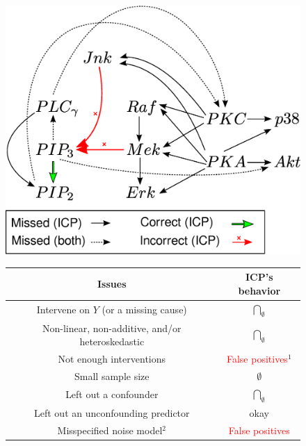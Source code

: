 \documentclass[12pt]{article}
\begin{document}
\maketitle

\newcommand{\tr}{\text{tr}}
\newcommand{\E}{\textbf{E}}
\newcommand{\diag}{\text{diag}}
\newcommand{\argmax}{\text{argmax}}
\newcommand{\Cov}{\text{Cov}}
\newcommand{\Var}{\text{Var}}
\newcommand{\argmin}{\text{argmin}}
\newcommand{\Vol}{\text{Vol}}
\newcommand{\comm}[1]{}

\begin{figure}[h]
\centering
\includegraphics[scale = 0.5]{drawing2legend.eps}
\end{figure}

\begin{figure}[h]
\centering
  \begin{tabular}{|c|c|}
    \hline
    \textbf{Issues} & \textbf{ICP's behavior} \\
    \hline
    Intervene on $Y$ (or a missing cause) &
    $\underset{\emptyset}{\bigcap}$ \\
    \hline
    Non-linear, non-additive, and/or heteroskedastic &
    $\underset{\emptyset}{\bigcap}$ \\
    \hline
    Not enough interventions &
    \textcolor{red}{False positives}$^1$ \\
    \hline
    Small sample size &
    $\emptyset$ \\
    \hline
    Left out a confounder & $\underset{\emptyset}{\bigcap}$ \\
    \hline
    Left out an unconfounding predictor & okay  \\
    \hline
    Misspecified noise model$^2$ & \textcolor{red}{False positives}\\\hline
  \end{tabular}
\end{figure}
\end{document}

